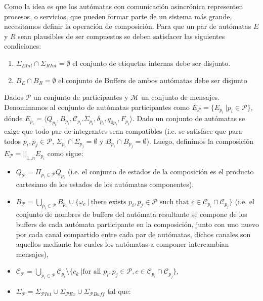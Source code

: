 Como la idea es que los autómatas con comunicación asincrónica representen procesos, o servicios, que pueden formar parte de un sistema más grande, necesitamos definir la operación de composición. Para que un par de autómatas $E$ y $R$ sean plausibles de ser compuestos se deben satisfacer las siguientes condiciones:
 \begin{enumerate}
\item $\Sigma_{E Int} \cap \Sigma_{R Int} = \emptyset$ el conjunto de etiquetas internas debe ser disjunto. 
\item $ B_E \cap B_R = \emptyset$ el conjunto de Buffers de ambos autómatas debe ser disjunto  
\end{enumerate}
\begin{definition}[Composición]\label{def:comp}
Dados $\mathcal{P}$ un conjunto de participantes y $\mathcal{M}$ un conjunto de mensajes. Denominamos al conjunto de autómatas participantes como $E_\mathcal{P} = \{E_{p_i} \ | p_i \in \mathcal{P}\}$, dónde $E_{p_i}= \langle Q_{p_i}, B_{p_i}, \mathcal{C}_{p_i}. \Sigma_{p_i}, \delta_{p_i}, q_{0{p_i}}, F_{p_i} \rangle$. Dado un conjunto de autómatas se exige que todo par de integrantes sean compatibles (i.e. se satisface que para todos $p_i, p_j \in \mathcal{P}$, $\Sigma_{p_i} \cap \Sigma_{p_j}= \emptyset$ y $B_{p_i} \cap B_{p_j} = \emptyset$). Luego, definimos la composición $E_\mathcal{P} = ||_{1..n} E_{p_i}$ como sigue:
\begin{itemize}
    \item $Q_\mathcal{P}= \Pi_{p_i \in \mathcal{P}} Q_{p_i}$ (i.e. el conjunto de estados de la composición es el producto cartesiano de los estados de los autómatas componentes),    
    \item $B_\mathcal{P} = \bigcup_{p_i \in \mathcal{P}} B_{p_i} \cup \{ \omega_c \ | \ \mbox{there exists } p_i, p_j \in \mathcal{P} \mbox{ such that } c \in \mathcal{C}_{p_i} \cap \mathcal{C}_{p_j} \}$ (i.e. el conjunto de nombres de buffers del autómata resultante se compone de los buffers de cada autómata participante en la composición, junto con uno nuevo por cada canal compartido entre cada par de autómatas, dichos canales son aquellos mediante los cuales los autómatas a componer intercambian mensajes),    
    \item $\mathcal{C}_\mathcal{P} = \bigcup_{p_i \in \mathcal{P}} \mathcal{C}_{p_i} \setminus \{ c_k \ | \mbox{for all } p_i, p_j \in \mathcal{P}, c \in \mathcal{C}_{p_i} \cap \mathcal{C}_{p_j} \}$,    
    \item $\Sigma_\mathcal{P} = \Sigma_{\mathcal{P}\mathit{Int}} \cup  \Sigma_{\mathcal{P}\mathit{Ex}} \cup \Sigma_{\mathcal{P}\mathit{Buff}}$ tal que:    

\end{itemize}
\end{definition}
